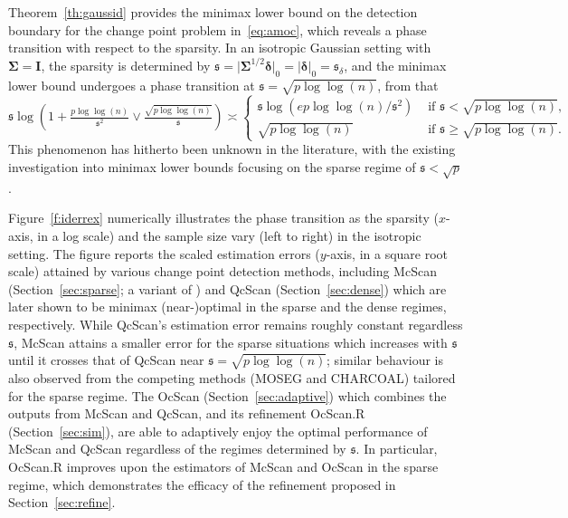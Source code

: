 \documentclass[11pt, a4paper]{article}
\newcommand{\mbf}{\mathbf}
\renewcommand{\l}{\left}
\renewcommand{\r}{\right}
\theoremstyle{definition}
\theoremstyle{definition}
\theoremstyle{definition}
\theoremstyle{definition}
\theoremstyle{definition}
\theoremstyle{remark}
\theoremstyle{definition}
\theoremstyle{definition}
\theoremstyle{definition}
\begin{document}
Theorem~\ref{th:gaussid} provides the minimax lower bound on the detection boundary for the change point problem in~\eqref{eq:amoc}, which reveals a phase transition with respect to the sparsity.  In an isotropic Gaussian setting with $\bm\Sigma = \mbf I$, the sparsity is determined by $\mathfrak{s} = \vert \bm\Sigma^{1/2} \bm\delta \vert_0 = \vert \bm\delta \vert_0 = \mathfrak{s}_\delta$, and the minimax lower bound undergoes a phase transition at $\mathfrak{s} = \sqrt{p{\log\log(n)}}$, from that 
\[
\mathfrak{s} \log\l( 1 + \tfrac{p{\log\log(n)}}{\mathfrak{s}^2} \vee \tfrac{\sqrt {p{\log\log(n)}}}{\mathfrak{s}} \r) \asymp 
\begin{cases}
\mathfrak{s} \log(ep{\log\log(n)}/\mathfrak{s}^2) &\text{ if }{\mathfrak{s} < \sqrt {p{\log\log(n)}}}, \\ \sqrt{p{\log\log(n)}} & \text{ if } {\mathfrak{s} \ge \sqrt {p{\log\log(n)}}}.
\end{cases}
\] 
This phenomenon has hitherto been unknown in the literature, with the existing investigation into minimax lower bounds focusing on the sparse regime of $\mathfrak{s} < \sqrt{p}$ \citep{rinaldo2020localizing, cho2024detection}. 

Figure~\ref{f:iderrex} numerically illustrates the phase transition as the sparsity ($x$-axis, in a log scale) and the sample size vary (left to right) %
in the isotropic setting.
The figure reports the scaled estimation errors ($y$-axis, in a square root scale) attained by various change point detection methods, including McScan (Section~\ref{sec:sparse}; a variant of \citealp{cho2024detection}) and QcScan (Section~\ref{sec:dense}) which are later shown to be minimax (near-)optimal in the sparse and the dense regimes, respectively. 
While QcScan's estimation error remains roughly constant regardless $\mathfrak{s}$, McScan attains a smaller error for the sparse situations which increases with $\mathfrak{s}$ until it crosses that of QcScan near $\mathfrak{s} = \sqrt{p{\log\log(n)}}$; similar behaviour is also observed from the competing methods (MOSEG and CHARCOAL) tailored for the sparse regime. 
The OcScan (Section~\ref{sec:adaptive}) which combines the outputs from McScan and QcScan, and its refinement OcScan.R (Section~\ref{sec:sim}), are able to adaptively enjoy the optimal performance of McScan and QcScan regardless of the regimes determined by $\mathfrak{s}$.
In particular, OcScan.R improves upon the estimators of McScan and OcScan in the sparse regime, which demonstrates the efficacy of the refinement proposed in Section~\ref{sec:refine}. 
\end{document}
